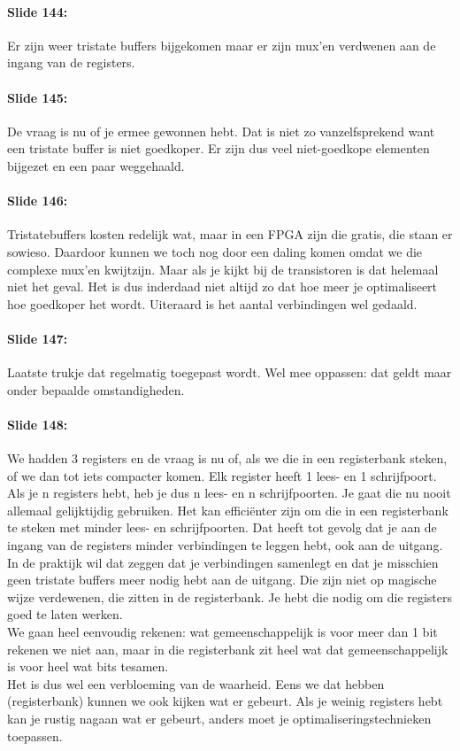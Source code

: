 \documentclass[10pt,a4paper]{book}
\begin{document}
\paragraph{Slide 144:} Er zijn weer tristate buffers bijgekomen maar er zijn mux'en verdwenen aan de ingang van de registers. 

\paragraph{Slide 145:} De vraag is nu of je ermee gewonnen hebt. Dat is niet zo vanzelfsprekend want een tristate buffer is niet goedkoper. Er zijn dus veel niet-goedkope elementen bijgezet en een paar weggehaald. 

\paragraph{Slide 146:} Tristatebuffers kosten redelijk wat, maar in een FPGA zijn die gratis, die staan er sowieso. Daardoor kunnen we toch nog door een daling komen omdat we die complexe mux'en kwijtzijn. Maar als je kijkt bij de transistoren is dat helemaal niet het geval. Het is dus inderdaad niet altijd zo dat hoe meer je optimaliseert hoe goedkoper het wordt. Uiteraard is het aantal verbindingen wel gedaald.

\paragraph{Slide 147:} Laatste trukje dat regelmatig toegepast wordt. Wel mee oppassen: dat geldt maar onder bepaalde omstandigheden. 

\paragraph{Slide 148:} We hadden 3 registers en de vraag is nu of, als we die in een registerbank steken, of we dan tot iets compacter komen. Elk register heeft 1 lees- en 1 schrijfpoort. Als je n registers hebt, heb je dus n lees- en n schrijfpoorten. Je gaat die nu nooit allemaal gelijktijdig gebruiken. Het kan effici\"enter zijn om die in een registerbank te steken met minder lees- en schrijfpoorten. Dat heeft tot gevolg dat je aan de ingang van de registers minder verbindingen te leggen hebt, ook aan de uitgang. In de praktijk wil dat zeggen dat je verbindingen samenlegt en dat je misschien geen tristate buffers meer nodig hebt aan de uitgang. Die zijn niet op magische wijze verdewenen, die zitten in de registerbank. Je hebt die nodig om die registers goed te laten werken.\\
We gaan heel eenvoudig rekenen: wat gemeenschappelijk is voor meer dan 1 bit rekenen we niet aan, maar in die registerbank zit heel wat dat gemeenschappelijk is voor heel wat bits tesamen.\\
Het is dus wel een verbloeming van de waarheid. Eens we dat hebben (registerbank) kunnen we ook kijken wat er gebeurt. Als je weinig registers hebt kan je rustig nagaan wat er gebeurt, anders moet je optimaliseringstechnieken toepassen.
\end{document}
